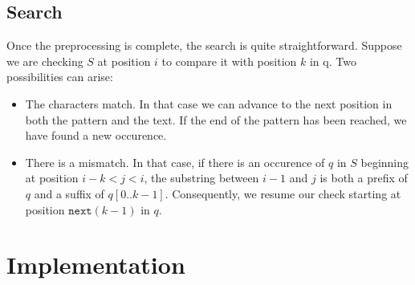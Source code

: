 \documentclass[a4paper,11pt,openany,extrafontsizes,twoside,article]{memoir}
\begin{document}
\subsection{Search}
\label{sec:search}

Once the preprocessing is complete, the search is quite
straightforward. Suppose we are checking $S$ at position $i$ to
compare it with position $k$ in q. Two possibilities can arise:
\begin{itemize}
\item The characters match. In that case we can advance to the next
  position in both the pattern and the text. If the end of the pattern
  has been reached, we have found a new occurence.
\item There is a mismatch. In that case, if there is an occurence of
  $q$ in $S$ beginning at position $i-k < j < i$, the substring
  between $i-1$ and $j$ is both a prefix of $q$ and a suffix of
  $q[0..k-1]$. Consequently, we resume our check starting at position
  $\mathtt{next}(k-1)$ in $q$.
\end{itemize}

\section{Implementation}
\label{sec:implementation-2}
\end{document}
